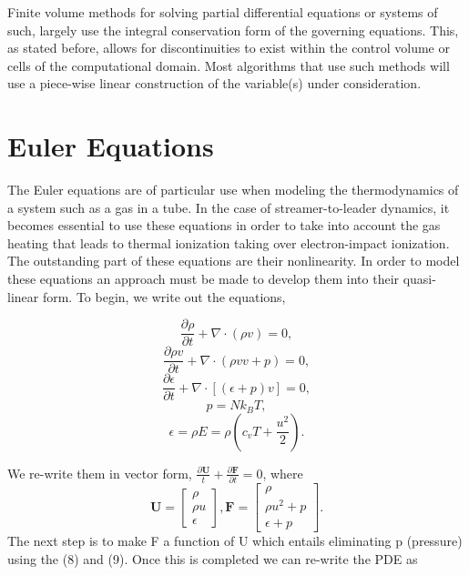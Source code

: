 \documentclass[]{article}
\begin{document}
	Finite volume methods for solving partial differential equations or systems of such, largely use the integral conservation form of the governing equations. This, as stated before, allows for discontinuities to exist within the control volume or cells of the computational domain. Most algorithms that use such methods will use a piece-wise linear construction of the variable(s) under consideration. 
	
\section{Euler Equations}

	The Euler equations are of particular use when modeling the thermodynamics of a system such as a gas in a tube. In the case of streamer-to-leader dynamics, it becomes essential to use these equations in order to take into account the gas heating that leads to thermal ionization taking over electron-impact ionization.  The outstanding part of these equations are their nonlinearity. In order to model these equations an approach must be made to develop them into their quasi-linear form. To begin, we write out the equations,
	
		\begin{equation}
		\frac{\partial\rho}{\partial t} + \nabla \cdot (\rho v) = 0,
	\end{equation} 
	\begin{equation}
		\frac{\partial \rho v}{\partial t} + \nabla \cdot (\rho v v + p) = 0,
	\end{equation}
	\begin{equation}
		\frac{\partial \epsilon}{\partial t} + \nabla \cdot [(\epsilon + p)v] = 0,
	\end{equation}	 
	\begin{equation}
		p = N k_B T,
	\end{equation} 
	\begin{equation}
	\epsilon = \rho E = \rho (c_v T + \frac{u^2}{2}) .
	\end{equation}

	We re-write them in vector form, $\frac{\partial \textbf{U}}{t} + \frac{\partial \textbf{F}}{\partial t} = 0$, where
    \begin{equation}
    		\textbf{U} =
    	\begin{bmatrix}
    		\rho \\
    		\rho u \\
    		\epsilon 
    	\end{bmatrix}, 
            \textbf{F} =
        \begin{bmatrix}
        	\rho \\
        	\rho u^2 + p \\
        	\epsilon + p 
        \end{bmatrix}.
    \end{equation}
    The next step is to make F a function of U which entails eliminating p (pressure) using the (8) and (9). Once this is completed we can re-write the PDE as
    
\end{document}
